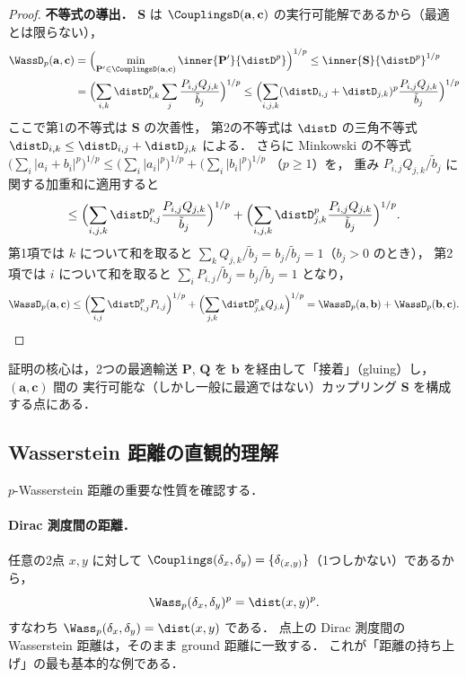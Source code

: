 \begin{proof}
  \medskip
  \textbf{不等式の導出．}
  $\mathbf{S}$ は $\CouplingsD(\mathbf{a}, \mathbf{c})$ の実行可能解であるから（最適とは限らない），
  \begin{align*}
    \WassD_p(\mathbf{a}, \mathbf{c})
    &= \Bigl(\min_{\mathbf{P}' \in \CouplingsD(\mathbf{a}, \mathbf{c})}
       \inner{\mathbf{P}'}{\distD^p}\Bigr)^{1/p}
    \leq \inner{\mathbf{S}}{\distD^p}^{1/p} \\
    &= \Bigl(\sum_{i,k} \distD_{i,k}^p
       \sum_j \frac{P_{i,j} Q_{j,k}}{\tilde{b}_j}\Bigr)^{1/p}
    \leq \Bigl(\sum_{i,j,k}
       (\distD_{i,j} + \distD_{j,k})^p
       \frac{P_{i,j} Q_{j,k}}{\tilde{b}_j}\Bigr)^{1/p}
  \end{align*}
  ここで第1の不等式は $\mathbf{S}$ の次善性，
  第2の不等式は $\distD$ の三角不等式 $\distD_{i,k} \leq \distD_{i,j} + \distD_{j,k}$
  による．
  さらに Minkowski の不等式
  $\bigl(\sum_i |a_i + b_i|^p\bigr)^{1/p}
  \leq \bigl(\sum_i |a_i|^p\bigr)^{1/p} + \bigl(\sum_i |b_i|^p\bigr)^{1/p}$
  （$p \geq 1$）を，
  重み $P_{i,j} Q_{j,k} / \tilde{b}_j$ に関する加重和に適用すると
  \[
    \leq \Bigl(\sum_{i,j,k}
       \distD_{i,j}^p \frac{P_{i,j} Q_{j,k}}{\tilde{b}_j}\Bigr)^{1/p}
    + \Bigl(\sum_{i,j,k}
       \distD_{j,k}^p \frac{P_{i,j} Q_{j,k}}{\tilde{b}_j}\Bigr)^{1/p}.
  \]
  第1項では $k$ について和を取ると
  $\sum_k Q_{j,k} / \tilde{b}_j = b_j / \tilde{b}_j = 1$（$b_j > 0$ のとき），
  第2項では $i$ について和を取ると
  $\sum_i P_{i,j} / \tilde{b}_j = b_j / \tilde{b}_j = 1$ となり，
  \[
    \WassD_p(\mathbf{a}, \mathbf{c})
    \leq \Bigl(\sum_{i,j} \distD_{i,j}^p P_{i,j}\Bigr)^{1/p}
    + \Bigl(\sum_{j,k} \distD_{j,k}^p Q_{j,k}\Bigr)^{1/p}
    = \WassD_p(\mathbf{a}, \mathbf{b})
    + \WassD_p(\mathbf{b}, \mathbf{c}).
  \]
\end{proof}

証明の核心は，2つの最適輸送 $\mathbf{P}$, $\mathbf{Q}$ を
$\mathbf{b}$ を経由して「接着」（gluing）し，$(\mathbf{a}, \mathbf{c})$ 間の
実行可能な（しかし一般に最適ではない）カップリング $\mathbf{S}$ を構成する点にある．

\subsection{Wasserstein 距離の直観的理解}

$p$-Wasserstein 距離の重要な性質を確認する．

\paragraph{Dirac 測度間の距離．}
任意の2点 $x, y$ に対して
$\Couplings(\delta_x, \delta_y) = \{\delta_{(x,y)}\}$（1つしかない）であるから，
\[
  \Wass_p(\delta_x, \delta_y)^p = \dist(x, y)^p.
\]
すなわち $\Wass_p(\delta_x, \delta_y) = \dist(x,y)$ である．
点上の Dirac 測度間の Wasserstein 距離は，そのまま ground 距離に一致する．
これが「距離の持ち上げ」の最も基本的な例である．

